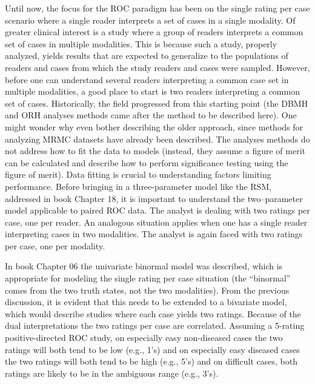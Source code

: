 \documentclass[
]{book}
\begin{document}
Until now, the focus for the ROC paradigm has been on the single rating per case scenario where a single reader interprets a set of cases in a single modality. Of greater clinical interest is a study where a group of readers interprets a common set of cases in multiple modalities. This is because such a study, properly analyzed, yields results that are expected to generalize to the populations of readers and cases from which the study readers and cases were sampled. However, before one can understand several readers interpreting a common case set in multiple modalities, a good place to start is two readers interpreting a common set of cases. Historically, the field progressed from this starting point (the DBMH and ORH analyses methods came after the method to be described here). One might wonder why even bother describing the older approach, since methods for analyzing MRMC datasets have already been described. The analyses methods do not address how to fit the data to models (instead, they assume a figure of merit can be calculated and describe how to perform significance testing using the figure of merit). Data fitting is crucial to understanding factors limiting performance. Before bringing in a three-parameter model like the RSM, addressed in book Chapter 18, it is important to understand the two--parameter model applicable to paired ROC data. The analyst is dealing with two ratings per case, one per reader. An analogous situation applies when one has a single reader interpreting cases in two modalities. The analyst is again faced with two ratings per case, one per modality.

In book Chapter 06 the univariate binormal model was described, which is appropriate for modeling the single rating per case situation (the ``binormal'' comes from the two truth states, not the two modalities). From the previous discussion, it is evident that this needs to be extended to a bivariate model, which would describe studies where each case yields two ratings. Because of the dual interpretations the two ratings per case are correlated. Assuming a 5-rating positive-directed ROC study, on especially easy non-diseased cases the two ratings will both tend to be low (e.g., 1's) and on especially easy diseased cases the two ratings will both tend to be high (e.g., 5's) and on difficult cases, both ratings are likely to be in the ambiguous range (e.g., 3's).
\end{document}
